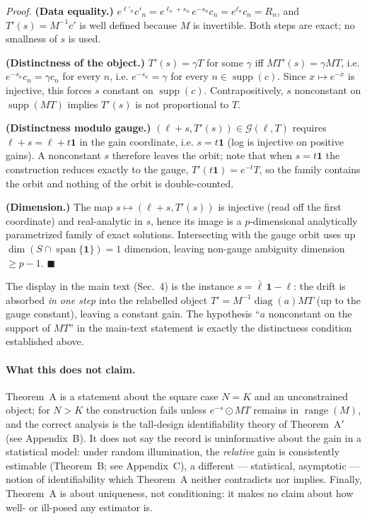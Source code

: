 \noindent\emph{Proof.} \textbf{(Data equality.)} $e^{\ell'_n}c'_n = e^{\ell_n + s_n}\, e^{-s_n} c_n = e^{\ell_n} c_n = R_n$, and $T'(s) = M^{-1}c'$ is well defined because $M$ is invertible. Both steps are exact; no smallness of $s$ is used.

\textbf{(Distinctness of the object.)} $T'(s) = \gamma T$ for some $\gamma$ iff $MT'(s) = \gamma MT$, i.e. $e^{-s_n} c_n = \gamma c_n$ for every $n$, i.e. $e^{-s_n} = \gamma$ for every $n \in \operatorname{supp}(c)$. Since $x \mapsto e^{-x}$ is injective, this forces $s$ constant on $\operatorname{supp}(c)$. Contrapositively, $s$ nonconstant on $\operatorname{supp}(MT)$ implies $T'(s)$ is not proportional to $T$.

\textbf{(Distinctness modulo gauge.)} $(\ell + s, T'(s)) \in \mathcal G(\ell,T)$ requires $\ell + s = \ell + t\mathbf 1$ in the gain coordinate, i.e. $s = t\mathbf 1$ (log is injective on positive gains). A nonconstant $s$ therefore leaves the orbit; note that when $s = t\mathbf 1$ the construction reduces exactly to the gauge, $T'(t\mathbf 1) = e^{-t}T$, so the family contains the orbit and nothing of the orbit is double-counted.

\textbf{(Dimension.)} The map $s \mapsto (\ell + s, T'(s))$ is injective (read off the first coordinate) and real-analytic in $s$, hence its image is a $p$-dimensional analytically parametrized family of exact solutions. Intersecting with the gauge orbit uses up $\dim(S \cap \operatorname{span}\{\mathbf 1\}) = 1$ dimension, leaving non-gauge ambiguity dimension $\ge p - 1$. \hfill$\blacksquare$

The display in the main text (Sec.~4) is the instance $s = \bar\ell\,\mathbf 1 - \ell$: the drift is absorbed \emph{in one step} into the relabelled object $T' = M^{-1}\operatorname{diag}(a)MT$ (up to the gauge constant), leaving a constant gain. The hypothesis ``$a$ nonconstant on the support of $MT$'' in the main-text statement is exactly the distinctness condition established above.

\paragraph{What this does not claim.} Theorem~A is a statement about the square case $N = K$ and an unconstrained object; for $N > K$ the construction fails unless $e^{-s}\odot MT$ remains in $\operatorname{range}(M)$, and the correct analysis is the tall-design identifiability theory of Theorem~A$'$ (see Appendix~B). It does not say the record is uninformative about the gain in a statistical model: under random illumination, the \emph{relative} gain is consistently estimable (Theorem~B; see Appendix~C), a different --- statistical, asymptotic --- notion of identifiability which Theorem~A neither contradicts nor implies. Finally, Theorem~A is about uniqueness, not conditioning: it makes no claim about how well- or ill-posed any estimator is.

